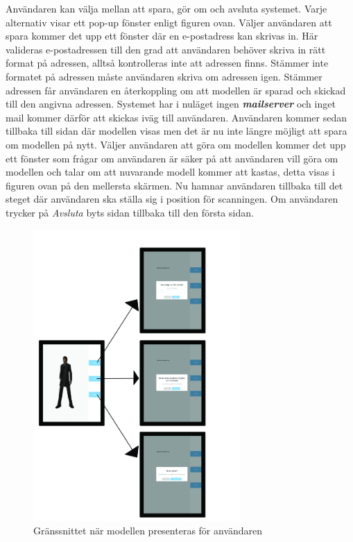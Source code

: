 \documentclass[a4paper,12pt,oneside,final]{extbook}
\begin{document}
Användaren kan välja mellan att spara, gör om och avsluta systemet. Varje alternativ visar ett pop-up fönster enligt figuren ovan. Väljer användaren att spara kommer det upp ett fönster där en e-postadress kan skrivas in. Här valideras e-postadressen till den grad att användaren behöver skriva in rätt format på adressen, alltså kontrolleras inte att adressen finns. Stämmer inte formatet på adressen måste användaren skriva om adressen igen. Stämmer adressen får användaren en återkoppling om att modellen är sparad och skickad till den angivna adressen. Systemet har i nuläget ingen \textbf{\emph{mailserver}} och inget mail kommer därför att skickas iväg till användaren. Användaren kommer sedan tillbaka till sidan där modellen visas men det är nu inte längre möjligt att spara om modellen på nytt. Väljer användaren att göra om modellen kommer det upp ett fönster som frågar om användaren är säker på att användaren vill göra om modellen och talar om att nuvarande modell kommer att kastas, detta visas i figuren ovan på den mellersta skärmen. Nu hamnar användaren tillbaka till det steget där användaren ska ställa sig i position för scanningen. Om användaren trycker på \emph{Avsluta} byts sidan tillbaka till den första sidan.


\begin{figure}[H]
  \centering
  \includegraphics[width=0.7\textwidth]{bilder/save_doover.jpg}
  \caption{Gränssnittet när modellen presenteras för användaren}
  \label{fig:gui2}
\end{figure}
\end{document}

